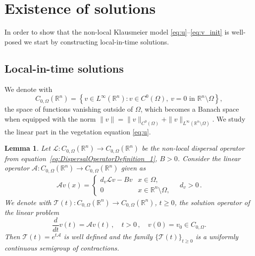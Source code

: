 \documentclass[preprint,12pt]{elsarticle}
\theoremstyle{plain}
\newtheorem{lem}{Lemma}[section]
\theoremstyle{definition}
\theoremstyle{remark}
\begin{document}
\section{Existence of solutions}
In order to show that the non-local Klausmeier model \eqref{eq:u}--\eqref{eq:v_init} is well-posed we start by constructing local-in-time solutions. 

\subsection{Local-in-time solutions} 
We denote with 
\begin{equation}
    \label{EQ:C_0_OMEGA}
    C_{0, \Omega}(\mathbb{R}^n) = \left\{ v \in L^\infty(\mathbb{R}^n): v \in C^0(\Omega), \: v = 0 \text{ in } \mathbb{R}^n \setminus \Omega \right\},
\end{equation}
the space of functions vanishing outside of $\Omega$, which becomes a Banach space when equipped with the norm $\|v\|= \|v\|_{C^0(\Omega)} + \|v\|_{L^\infty(\mathbb{R}^n\setminus \Omega)}$. We study the linear part in the vegetation equation \eqref{eq:u}.  

\begin{lem} 
Let $\mathcal{L}:  C_{0, \Omega}(\mathbb{R}^n) \to C_{0, \Omega}(\mathbb{R}^n)$ be the non-local dispersal operator from equation~\eqref{eq:DispersalOperatorDefinition_1}, $B>0$.
Consider the linear operator $\mathcal{A}: C_{0, \Omega}(\mathbb{R}^n) \to C_{0, \Omega}(\mathbb{R}^n)$ given as
\begin{align}
    \label{EQ:A_OPERATOR_DEFINITION}
    \mathcal{A} v (x) =
    \begin{cases}
        d_v\mathcal{L}v - Bv &x \in \Omega, \\
        0 &x \in \mathbb{R}^n \setminus \Omega,
    \end{cases} \quad d_v >0 \,.
\end{align} 
We denote with $\mathcal{T}(t) : C_{0, \Omega} (\mathbb{R}^n) \to  C_{0, \Omega} (\mathbb{R}^n)$, $t \geq 0$, the solution operator of the linear problem 
    \begin{equation}
        \label{eq:v_semilinear_problem}
        \frac{d}{dt} v(t) = \mathcal{A} v (t) \,, \quad t > 0 \,, \quad  v(0) = v_0 \in C_{0, \Omega}.
    \end{equation}
Then $\mathcal{T}(t) = e^{t\mathcal{A}}$ is well defined and the family $\{\mathcal{T}(t)\}_{t \geq 0}$ is a uniformly continuous semigroup of contractions.
    \label{lem:A_SEMIGROUP_GENERATOR}
\end{lem}
\end{document}

